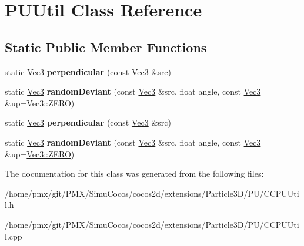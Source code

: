 \hypertarget{classPUUtil}{}\section{P\+U\+Util Class Reference}
\label{classPUUtil}
\subsection*{Static Public Member Functions}
\begin{DoxyCompactItemize}
\item 
\mbox{\label{classPUUtil_a60c408e8e03007c2d3fb84d79060e28b}} 
static \hyperlink{classVec3}{Vec3} {\bfseries perpendicular} (const \hyperlink{classVec3}{Vec3} \&src)
\item 
\mbox{\label{classPUUtil_a125f346c3101f2337f758d2d7caaff4e}} 
static \hyperlink{classVec3}{Vec3} {\bfseries random\+Deviant} (const \hyperlink{classVec3}{Vec3} \&src, float angle, const \hyperlink{classVec3}{Vec3} \&up=\hyperlink{classVec3_a26c0c52a5fba36ed0ef5e6d5026569f4}{Vec3\+::\+Z\+E\+RO})
\item 
\mbox{\label{classPUUtil_a734b0d2bbf1f53d27f5c424f47ab12d8}} 
static \hyperlink{classVec3}{Vec3} {\bfseries perpendicular} (const \hyperlink{classVec3}{Vec3} \&src)
\item 
\mbox{\label{classPUUtil_acbbbe17dd1e699a3931679db4c3d998b}} 
static \hyperlink{classVec3}{Vec3} {\bfseries random\+Deviant} (const \hyperlink{classVec3}{Vec3} \&src, float angle, const \hyperlink{classVec3}{Vec3} \&up=\hyperlink{classVec3_a26c0c52a5fba36ed0ef5e6d5026569f4}{Vec3\+::\+Z\+E\+RO})
\end{DoxyCompactItemize}


The documentation for this class was generated from the following files\+:\begin{DoxyCompactItemize}
\item 
/home/pmx/git/\+P\+M\+X/\+Simu\+Cocos/cocos2d/extensions/\+Particle3\+D/\+P\+U/C\+C\+P\+U\+Util.\+h\item 
/home/pmx/git/\+P\+M\+X/\+Simu\+Cocos/cocos2d/extensions/\+Particle3\+D/\+P\+U/C\+C\+P\+U\+Util.\+cpp\end{DoxyCompactItemize}
